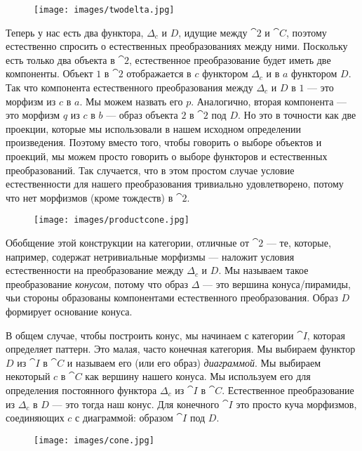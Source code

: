 \begin{figure}[H]
  \centering
  \texttt{[image: images/twodelta.jpg]}
\end{figure}

\noindent
Теперь у нас есть два функтора, $\Delta_c$ и $D$, идущие между
$\cat{2}$ и $\cat{C}$, поэтому естественно спросить о естественных
преобразованиях между ними. Поскольку есть только два объекта в
$\cat{2}$, естественное преобразование будет иметь две компоненты. Объект $1$
в $\cat{2}$ отображается в $c$ функтором $\Delta_c$ и в
$a$ функтором $D$. Так что компонента естественного преобразования между
$\Delta_c$ и $D$ в $1$ --- это морфизм из $c$ в
$a$. Мы можем назвать его $p$. Аналогично, вторая компонента
--- это морфизм $q$ из $c$ в $b$ --- образ
объекта $2$ в $\cat{2}$ под $D$. Но это в точности как две
проекции, которые мы использовали в нашем исходном определении произведения. Поэтому
вместо того, чтобы говорить о выборе объектов и проекций, мы можем просто
говорить о выборе функторов и естественных преобразований. Так случается,
что в этом простом случае условие естественности для нашего преобразования
тривиально удовлетворено, потому что нет морфизмов (кроме
тождеств) в $\cat{2}$.

\begin{figure}[H]
  \centering
  \texttt{[image: images/productcone.jpg]}
\end{figure}

\noindent
Обобщение этой конструкции на категории, отличные от
$\cat{2}$ --- те, которые, например, содержат нетривиальные морфизмы
--- наложит условия естественности на преобразование между
$\Delta_c$ и $D$. Мы называем такое преобразование \emph{конусом},
потому что образ $\Delta$ --- это вершина конуса/пирамиды, чьи стороны
образованы компонентами естественного преобразования. Образ $D$
формирует основание конуса.

В общем случае, чтобы построить конус, мы начинаем с категории $\cat{I}$, которая
определяет паттерн. Это малая, часто конечная категория. Мы выбираем
функтор $D$ из $\cat{I}$ в $\cat{C}$ и называем его (или его образ)
\emph{диаграммой}. Мы выбираем некоторый $c$ в $\cat{C}$ как вершину нашего
конуса. Мы используем его для определения постоянного функтора $\Delta_c$ из
$\cat{I}$ в $\cat{C}$. Естественное преобразование из $\Delta_c$
в $D$ --- это тогда наш конус. Для конечного $\cat{I}$ это просто куча
морфизмов, соединяющих $c$ с диаграммой: образом $\cat{I}$
под $D$.

\begin{figure}[H]
  \centering
  \texttt{[image: images/cone.jpg]}
\end{figure}

